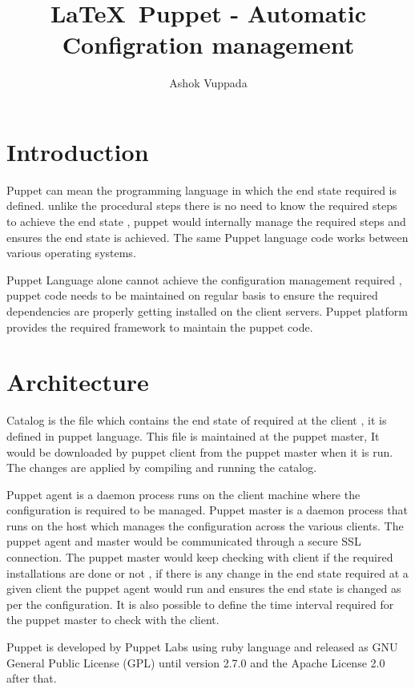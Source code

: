 \documentclass[9pt,twocolumn,twoside]{styles/osajnl}
\title{\LaTeX\ Puppet - Automatic Configration management }
\author[1,*]{Ashok Vuppada}
\affil[1]{School of Informatics and Computing, Bloomington, IN 47408, U.S.A.}
\affil[*]{Corresponding authors: ashokmadhu66@gmail.com}
\begin{document}
\maketitle

\section{Introduction}

Puppet can mean the programming language in which the end state
required is defined. unlike the procedural steps there is no need to
know the required steps to achieve the end state , puppet would
internally manage the required steps and ensures the end state is
achieved. The same Puppet language code works between various
operating systems. \cite{www-infoq}

Puppet Language alone cannot achieve the configuration management
required , puppet code needs to be maintained on regular basis to
ensure the required dependencies are properly getting installed on the
client servers. Puppet platform provides the required framework to
maintain the puppet code. \cite{www-infoq}

\section{Architecture}

Catalog is the file which contains the end state of required at the
client , it is defined in puppet language. This file is maintained at
the puppet master, It would be downloaded by puppet client from the
puppet master when it is run. The changes are applied by compiling and
running the catalog.\cite{www-docpuppet}

Puppet agent is a daemon process runs on the client machine where the
configuration is required to be managed. Puppet master is a daemon
process that runs on the host which manages the configuration across
the various clients. The puppet agent and master would be communicated
through a secure SSL connection. The puppet master would keep checking
with client if the required installations are done or not , if there
is any change in the end state required at a given client the puppet
agent would run and ensures the end state is changed as per the
configuration. It is also possible to define the time interval
required for the puppet master to check with the client.\cite{www-slashroot}

Puppet is developed by Puppet Labs using ruby language and released as
GNU General Public License (GPL) until version 2.7.0 and the Apache
License 2.0 after that.\cite{www-wiki-puppet}
\end{document}
